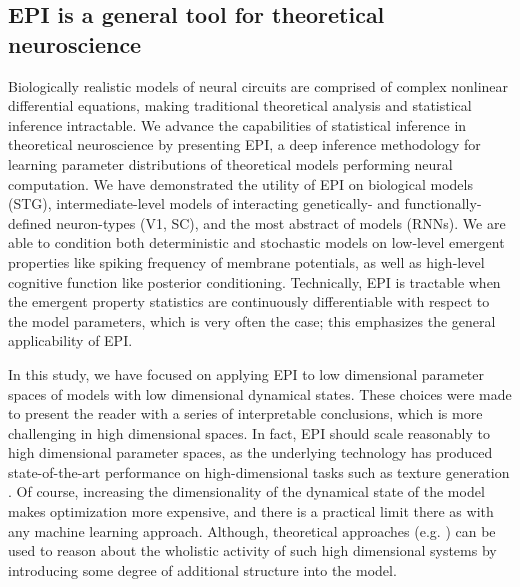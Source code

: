 \documentclass[11pt]{article}
\begin{document}
\subsection{EPI is a general tool for theoretical neuroscience} 
Biologically realistic models of neural circuits are comprised of complex nonlinear differential equations, making traditional theoretical analysis and statistical inference intractable. 
We advance the capabilities of statistical inference in theoretical neuroscience by presenting EPI, a deep inference methodology for learning parameter distributions of theoretical models performing neural computation.
We have demonstrated the utility of EPI on biological models (STG), intermediate-level models of interacting genetically- and functionally-defined neuron-types (V1, SC), and the most abstract of models (RNNs).  
We are able to condition both deterministic and stochastic models on low-level emergent properties like spiking frequency of membrane potentials, as well as high-level cognitive function like posterior conditioning.
Technically, EPI is tractable when the emergent property statistics are continuously differentiable with respect to the model parameters, which is very often the case; this emphasizes the general applicability of EPI.

In this study, we have focused on applying EPI to low dimensional parameter spaces of models with low dimensional dynamical states.
These choices were made to present the reader with a series of  interpretable conclusions, which is more challenging in high dimensional spaces.
In fact, EPI should scale reasonably to high dimensional parameter spaces, as the underlying technology has produced state-of-the-art performance on high-dimensional tasks such as texture generation \cite{loaiza2017maximum}.
Of course, increasing the dimensionality of the dynamical state of the model makes optimization more expensive, and there is a practical limit there as with any machine learning approach.
Although, theoretical approaches (e.g. \cite{mastrogiuseppe2018linking}) can be used to reason about the wholistic activity of such high dimensional systems by introducing some degree of additional structure into the model.
\end{document}
